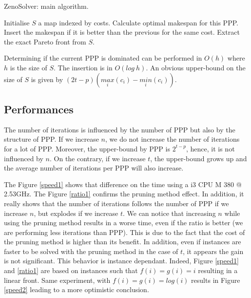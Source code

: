 \documentclass{llncs}
\def\ZENOSOLVER{{\sc ZenoSolver}}
\begin{document}
\begin{algorithm}
\caption{\label{alg:zeno}\ZENOSOLVER: main algorithm.}
\begin{algorithmic}
\STATE Initialise $S$ a map indexed by costs.
            \STATE Calculate optimal makespan for this PPP.
            \STATE Insert the makespan if it is better than the previous for the same cost.
        \ENDIF
    \ENDFOR
\ENDFOR
\STATE Extract the exact Pareto front from $S$.
\end{algorithmic}
\end{algorithm}
Determining if the current PPP is dominated can be performed in $O(h)$ where $h$ is the size of $S$. 
The insertion is in $O(log~h)$. 
An obvious upper-bound on the size of $S$ is given by $(2t-p)(\underset{i}{max}(c_i) - \underset{i}{min}(c_i))$.

\subsection{Performances}

The number of iterations is influenced by the number of PPP but also by the structure of PPP. If we increase $n$, we do not increase the number of iterations for a lot of PPP. Moreover, the upper-bound by PPP is $2^{t-p}$, hence, it is not influenced by $n$. On the contrary, if we increase $t$, the upper-bound grows up and the average number of iterations per PPP will also increase.

The Figure \ref{speed1} shows that difference on the time using a i3 CPU M 380 @ 2.53GHz. The Figure \ref{ratio1} confirms the pruning method effect. In addition, it really shows that the number of iterations follows the number of PPP if we increase $n$, but explodes if we increase $t$. We can notice that increasing $n$ while using the pruning method results in a worse time, even if the ratio is better (we are performing less iterations than PPP). This is due to the fact that the cost of the pruning method is higher than its benefit. In addition, even if instances are faster to be solved with the pruning method in the case of $t$, it appears the gain is not significant. This behavior is instance dependant. Indeed, Figure \ref{speed1} and \ref{ratio1} are based on instances such that $f(i) = g(i) = i$ resulting in a linear front. Same experiment, with $f(i) = g(i) = log(i)$ results in Figure \ref{speed2} leading to a more optimistic conclusion.
\end{document}

